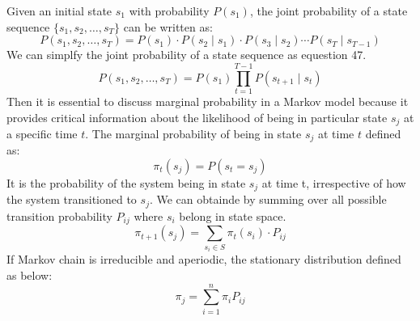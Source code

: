 \documentclass[12pt,a4paper]{article}
\begin{document}
Given an initial state \( s_1 \) with probability \( P(s_1) \), the joint probability of a state sequence \( \{s_1, s_2, \dots, s_T\} \) can be written as:
\begin{equation}
    P(s_1, s_2, \dots, s_T) = P(s_1) \cdot P(s_2 \mid s_1) \cdot P(s_3 \mid s_2) \cdots P(s_T \mid s_{T-1})
\end{equation}
We can simplfy the joint probability of a state sequence as equestion 47.
\begin{equation}
    P(s_1, s_2, \dots, s_T) = P(s_1) \prod_{t=1}^{T-1} P(s_{t+1} \mid s_{t})
\end{equation}
Then it is essential to discuss marginal probability in a Markov model because it provides critical information about the likelihood of being in particular state $s_j$ at a specific time $t$. The marginal probability of being in state $s_j$ at time $t$ defined as:
\begin{equation}
    \pi_t(s_j) = P(s_t=s_j)
\end{equation}
It is the probability of the system being in state $s_j$ at time t, irrespective of how the system transitioned to $s_j$. We can obtainde by summing over all possible transition probability $P_{ij}$ where $s_i$ belong in state space. 
\begin{equation}
    \pi_{t+1}(s_j) = \sum_{s_i \in S} \pi_t(s_i) \cdot P_{ij}
\end{equation}
If Markov chain is irreducible and aperiodic, the stationary distribution defined as below:
\begin{equation}
    \pi_j = \sum_{i=1}^{n} \pi_i P_{ij}
\end{equation}

\newpage
\end{document}
